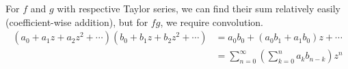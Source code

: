 \documentclass[10pt]{extarticle}
\begin{document}
  For $f$ and $g$ with respective Taylor series, we can find their sum relatively easily (coefficient-wise addition), but for $fg$, we require convolution.
  \begin{align*}
    \left(a_0 + a_1z + a_2z^2 + \cdots\right)\left(b_0 + b_1z + b_2z^2 + \cdots\right) &= a_0b_0 + (a_0b_1 + a_1b_0)z + \cdots\\
                                                                                       &= \sum_{n=0}^{\infty}\left(\sum_{k=0}^{n}a_kb_{n-k}\right)z^n
  \end{align*}
\end{document}
